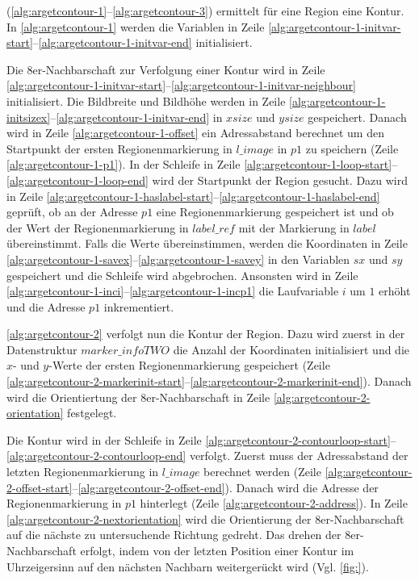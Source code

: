  (\autoref{alg:argetcontour-1}--\autoref{alg:argetcontour-3}) ermittelt für eine Region eine
 Kontur. In \autoref{alg:argetcontour-1} werden die Variablen in Zeile
 \ref{alg:argetcontour-1-initvar-start}--\ref{alg:argetcontour-1-initvar-end} initialisiert.



Die 8er-Nachbarschaft zur Verfolgung einer Kontur wird in Zeile
 \ref{alg:argetcontour-1-initvar-start}--\ref{alg:argetcontour-1-initvar-neighbour} initialisiert. Die Bildbreite und
 Bildhöhe werden in Zeile \ref{alg:argetcontour-1-initsizex}--\ref{alg:argetcontour-1-initvar-end} in $\mathit{xsize}$
 und $\mathit{ysize}$ gespeichert. Danach wird in Zeile \ref{alg:argetcontour-1-offset} ein Adressabstand berechnet um
 den Startpunkt der ersten Regionenmarkierung in $\mathit{l\_image}$ in $\mathit{p1}$ zu speichern (Zeile
 \ref{alg:argetcontour-1-p1}). In der Schleife in Zeile
 \ref{alg:argetcontour-1-loop-start}--\ref{alg:argetcontour-1-loop-end} wird der Startpunkt der Region gesucht. Dazu
 wird in Zeile \ref{alg:argetcontour-1-haslabel-start}--\ref{alg:argetcontour-1-haslabel-end} geprüft, ob an der
 Adresse $\mathit{p1}$ eine Regionenmarkierung gespeichert ist und ob der Wert der Regionenmarkierung in
 $\mathit{label\_ref}$ mit der Markierung in $\mathit{label}$ übereinstimmt. Falls die Werte übereinstimmen, werden die
 Koordinaten in Zeile \ref{alg:argetcontour-1-savex}--\ref{alg:argetcontour-1-savey} in den Variablen $\mathit{sx}$ und
 $\mathit{sy}$ gespeichert und die Schleife wird abgebrochen. Ansonsten wird in Zeile
 \ref{alg:argetcontour-1-inci}--\ref{alg:argetcontour-1-incp1} die Laufvariable $i$ um $1$ erhöht und die Adresse
 $\mathit{p1}$ inkrementiert.

\autoref{alg:argetcontour-2} verfolgt nun die Kontur der Region. Dazu wird zuerst in der Datenstruktur
 $\mathit{marker\_infoTWO}$ die Anzahl der Koordinaten initialisiert und die $x$- und $y$-Werte der ersten
 Regionenmarkierung gespeichert (Zeile
 \ref{alg:argetcontour-2-markerinit-start}--\ref{alg:argetcontour-2-markerinit-end}). Danach wird die Orientiertung der
 8er-Nachbarschaft in Zeile \ref{alg:argetcontour-2-orientation} festgelegt.



Die Kontur wird in der Schleife in Zeile
 \ref{alg:argetcontour-2-contourloop-start}--\ref{alg:argetcontour-2-contourloop-end} verfolgt. Zuerst muss der
 Adressabstand der letzten Regionenmarkierung in $\mathit{l\_image}$ berechnet werden (Zeile
 \ref{alg:argetcontour-2-offset-start}--\ref{alg:argetcontour-2-offset-end}). Danach wird die Adresse der
 Regionenmarkierung in $\mathit{p1}$ hinterlegt (Zeile \ref{alg:argetcontour-2-address}). In Zeile
 \ref{alg:argetcontour-2-nextorientation} wird die Orientierung der 8er-Nachbarschaft auf die nächste zu untersuchende
 Richtung gedreht. Das drehen der 8er-Nachbarschaft erfolgt, indem von der letzten Position einer Kontur im
 Uhrzeigersinn auf den nächsten Nachbarn weitergerückt wird (Vgl. \autoref{fig:}).

